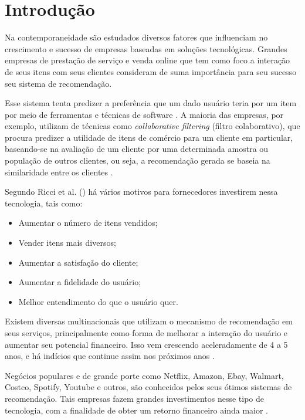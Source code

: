 \chapter{Introdução}

Na contemporaneidade são estudados diversos fatores que influenciam no crescimento e sucesso de empresas baseadas em soluções tecnológicas. Grandes empresas de prestação de serviço e venda online que tem como foco a interação de seus itens com seus clientes consideram de suma importância para seu sucesso seu sistema de recomendação.

Esse sistema tenta predizer a preferência que um dado usuário teria por um item por meio de ferramentas e técnicas de software \cite{souza:2014}. A maioria das empresas, por exemplo, utilizam de técnicas como \textit{collaborative filtering} (filtro colaborativo), que procura predizer a utilidade de itens de comércio para um cliente em particular, baseando-se na avaliação de um cliente por uma determinada amostra ou população de outros clientes, ou seja, a recomendação gerada se baseia na similaridade entre os clientes \cite{Linden:2003}.

Segundo Ricci et al. (\citeyear{Ricci:2010}) há vários motivos para fornecedores investirem nessa tecnologia, tais como:

\begin{itemize}
    \item Aumentar o número de itens vendidos;
    \item Vender itens mais diversos;
    \item Aumentar a satisfação do cliente;
    \item Aumentar a fidelidade do usuário;
    \item Melhor entendimento do que o usuário quer.
\end{itemize}

Existem diversas multinacionais que utilizam o mecanismo de recomendação em seus serviços, principalmente como forma de melhorar a interação do usuário e aumentar seu potencial financeiro. Isso vem crescendo aceleradamente de 4 a 5 anos, e há indícios que continue assim nos próximos anos \cite{Underwood:2017}.

Negócios populares e de grande porte como Netflix, Amazon, Ebay, Walmart, Costco, Spotify, Youtube e outros, são conhecidos pelos seus ótimos sistemas de recomendação. Tais empresas fazem grandes investimentos nesse tipo de tecnologia, com a finalidade de obter um retorno financeiro ainda maior \cite{Underwood:2017}.

